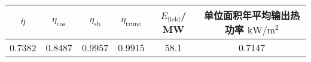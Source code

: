 \begin{tabular}{|cccccc|}
\hline
\(\bar \eta\) & \(\eta _{\cos}\) & \(\eta _{\mathrm{s b}}\) & \(\eta _{\mathrm{trunc}}\) & \(E_{\mathrm{field}}\)/ MW &单位面积年平均输出热功率 \(\mathrm{kW}/\mathrm{m}^{2}\)\\
\hline
0.7382 & 0.8487 & 0.9957 & 0.9915 & 58.1 & 0.7147\\
\hline
\end{tabular}
